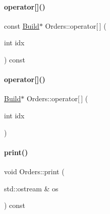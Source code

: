 \paragraph{\texorpdfstring{operator[]()}{operator[]()}\hspace{0.1cm}{\footnotesize\ttfamily [1/2]}}
{\footnotesize\ttfamily const \mbox{\hyperlink{class_build}{Build}}$\ast$ Orders\+::operator\mbox{[}$\,$\mbox{]} (\begin{DoxyParamCaption}\item[{int}]{idx }\end{DoxyParamCaption}) const\hspace{0.3cm}{\ttfamily [inline]}}

\mbox{\label{class_orders_aca77a601a993ef2d5dcfb71b9ee41542}} 
\paragraph{\texorpdfstring{operator[]()}{operator[]()}\hspace{0.1cm}{\footnotesize\ttfamily [2/2]}}
{\footnotesize\ttfamily \mbox{\hyperlink{class_build}{Build}}$\ast$ Orders\+::operator\mbox{[}$\,$\mbox{]} (\begin{DoxyParamCaption}\item[{int}]{idx }\end{DoxyParamCaption})\hspace{0.3cm}{\ttfamily [inline]}}

\mbox{\label{class_orders_a57fb3a5db65235ac3eb6dee473f7ef34}} 
\paragraph{\texorpdfstring{print()}{print()}\hspace{0.1cm}{\footnotesize\ttfamily [1/2]}}
{\footnotesize\ttfamily void Orders\+::print (\begin{DoxyParamCaption}\item[{std\+::ostream \&}]{os }\end{DoxyParamCaption}) const}

